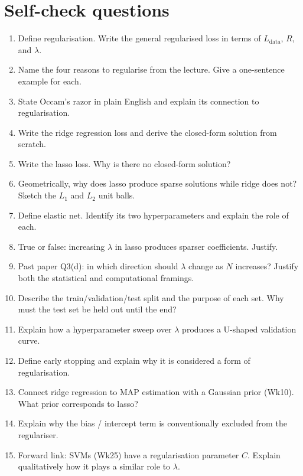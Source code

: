 \documentclass[11pt, a4paper]{article}
\begin{document}
\section*{Self-check questions}

\begin{enumerate}
  \item Define regularisation. Write the general regularised loss in terms of $L_{\text{data}}$, $R$, and $\lambda$.
  \item Name the four reasons to regularise from the lecture. Give a one-sentence example for each.
  \item State Occam's razor in plain English and explain its connection to regularisation.
  \item Write the ridge regression loss and derive the closed-form solution from scratch.
  \item Write the lasso loss. Why is there no closed-form solution?
  \item Geometrically, why does lasso produce sparse solutions while ridge does not? Sketch the $L_1$ and $L_2$ unit balls.
  \item Define elastic net. Identify its two hyperparameters and explain the role of each.
  \item True or false: increasing $\lambda$ in lasso produces sparser coefficients. Justify.
  \item Past paper Q3(d): in which direction should $\lambda$ change as $N$ increases? Justify both the statistical and computational framings.
  \item Describe the train/validation/test split and the purpose of each set. Why must the test set be held out until the end?
  \item Explain how a hyperparameter sweep over $\lambda$ produces a U-shaped validation curve.
  \item Define early stopping and explain why it is considered a form of regularisation.
  \item Connect ridge regression to MAP estimation with a Gaussian prior (Wk10). What prior corresponds to lasso?
  \item Explain why the bias / intercept term is conventionally excluded from the regulariser.
  \item Forward link: SVMs (Wk25) have a regularisation parameter $C$. Explain qualitatively how it plays a similar role to $\lambda$.
\end{enumerate}
\end{document}
